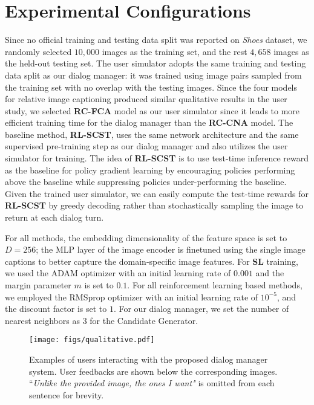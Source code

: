 \section{Experimental Configurations}
\label{sec:config}
Since no official training and testing data split was reported on {\em Shoes} 
dataset, we randomly selected $10,000$ images as the training set, 
and the rest $4,658$ images as the held-out testing set. The user simulator adopts
the same training and testing data split as our dialog manager: it
was trained using image pairs sampled from the training set with no overlap 
with the testing images. Since the four models for relative image captioning produced
similar qualitative results in the user study, we selected \textbf{RC-FCA} model as our user simulator since it leads to more efficient training time for the dialog manager 
than the \textbf{RC-CNA} model. 
The baseline method, \textbf{RL-SCST}, uses the same network architecture
and the same supervised pre-training step as our dialog manager 
and also utilizes the user simulator for training. The idea of \textbf{RL-SCST} is to 
use test-time inference reward as the baseline for policy gradient learning 
by encouraging policies performing above 
the baseline while suppressing policies under-performing the baseline. 
Given the trained user simulator, we can easily compute the test-time 
rewards for \textbf{RL-SCST} by greedy decoding rather than stochastically sampling 
the image to return at each dialog turn. 

For all methods, the embedding dimensionality of the feature space is set to $D= 256$;
the MLP layer of the image encoder is finetuned using the single image captions 
to better capture the domain-specific image features. For \textbf{SL} training, 
we used the ADAM optimizer with an initial learning rate of $0.001$ and the 
margin parameter $m$ is set to $0.1$. For all reinforcement 
learning based methods, we employed the RMSprop optimizer with an initial learning 
rate of $10^{-5}$, and the discount factor is set to $1$. 
For our dialog manager, we set the number of nearest neighbors
as $3$ for the Candidate Generator. 
 
\begin{figure*}
\centering
\texttt{[image: figs/qualitative.pdf]}
\caption{Examples of users interacting with the proposed dialog manager system.
User feedbacks are shown below the corresponding images. ``\emph{Unlike the provided image, the ones I want"} is omitted from each sentence for brevity.}
\label{fig:qualitative}
\end{figure*}
